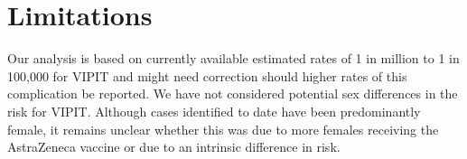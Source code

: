 \documentclass[]{interact}
\theoremstyle{plain}%
\theoremstyle{definition}
\theoremstyle{remark}
\begin{document}
\hypertarget{limitations}{%
\section{Limitations}\label{limitations}}

Our analysis is based on currently available estimated rates of 1 in
million to 1 in 100,000 for VIPIT and might need correction should
higher rates of this complication be reported. We have not considered
potential sex differences in the risk for VIPIT. Although cases
identified to date have been predominantly female, it remains unclear
whether this was due to more females receiving the AstraZeneca vaccine
or due to an intrinsic difference in risk.



\end{document}
